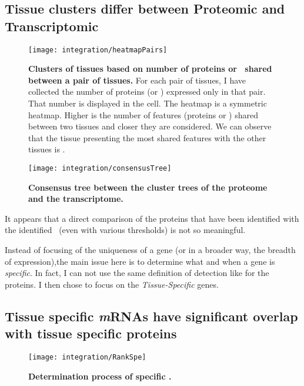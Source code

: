 \subsection{Tissue clusters differ between Proteomic and Transcriptomic}
\begin{figure}[!htbp]
\texttt{[image: integration/heatmapPairs]}\centering
    \caption[Clusters of tissues based on number of proteins or \mRNAs\ shared
    between a pair of tissues]{\label{fig:heatmapPairs}\textbf{Clusters of
    tissues based on number of proteins or \mRNAs\ shared between a pair of
    tissues.} For each pair of tissues, I have collected the number of proteins
    (or \mRNAs) expressed only in that pair. That number is displayed in the
    cell. The heatmap is a symmetric heatmap. Higher is the number of features
    (proteins or \mRNAs) shared between two tissues and closer they are
    considered. We can observe that the tissue presenting the most shared features
    with the other tissues is .}
\end{figure}


\begin{figure}[!htbp]
\texttt{[image: integration/consensusTree]}\centering
    \caption[Consensus tree between the cluster trees of the proteome and the
    transcriptome]{\label{fig:consensusTree}\textbf{Consensus tree between the
    cluster trees of the proteome and the transcriptome.}}
\end{figure}

It appears that a direct comparison of the proteins that have been identified
with the identified \mRNAs\ (even with various thresholds) is not so meaningful.

Instead of focusing of the uniqueness of a gene (or in a broader way, the breadth
of expression),the main issue here is to
determine what and when a gene is \emph{specific}. In fact, I can not use
the same definition of detection like for the proteins. I then chose to focus
on the \emph{Tissue-Specific} genes.

\subsection{Tissue specific \textit{m}RNAs have significant overlap with tissue
specific proteins}

\begin{figure}[!htbp]
\texttt{[image: integration/RankSpe]}\centering
    \caption[Determination process of specific
    mRNAs]{\label{fig:RankSpe}\textbf{Determination process of specific \mRNAs.}}
\end{figure}


